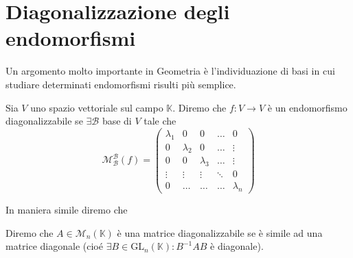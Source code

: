 \chapter{Diagonalizzazione degli endomorfismi}

Un argomento molto importante in Geometria è l'individuazione di basi in cui studiare determinati endomorfismi risulti
più semplice. 
\begin{definition}
    Sia $V$ uno spazio vettoriale sul campo $\mathbb{K}$. Diremo che $f: V \to V$ è un endomorfismo diagonalizzabile se $\exists \mathcal{B}$ base di $V$
    tale che
    $$
        \mathcal{M}^\mathcal{B}_\mathcal{B}(f) = \begin{pmatrix}
            \lambda_1 & 0 & 0 & \ldots & 0 \\
            0 & \lambda_2 & 0 & \ldots & \vdots \\
            0 & 0 & \lambda_3 & \ldots & \vdots \\
            \vdots & \vdots & \vdots & \ddots & 0 \\
            0 & \ldots & \ldots & \ldots & \lambda_n
        \end{pmatrix}
    $$
\end{definition}
In maniera simile diremo che
\begin{definition}
    Diremo che $A \in \mathcal{M}_n(\mathbb{K})$ è una matrice diagonalizzabile se è simile ad una matrice diagonale (cioé $\exists B \in \text{GL}_n(\mathbb{K}) : B^{-1}AB$ è diagonale).
\end{definition}

